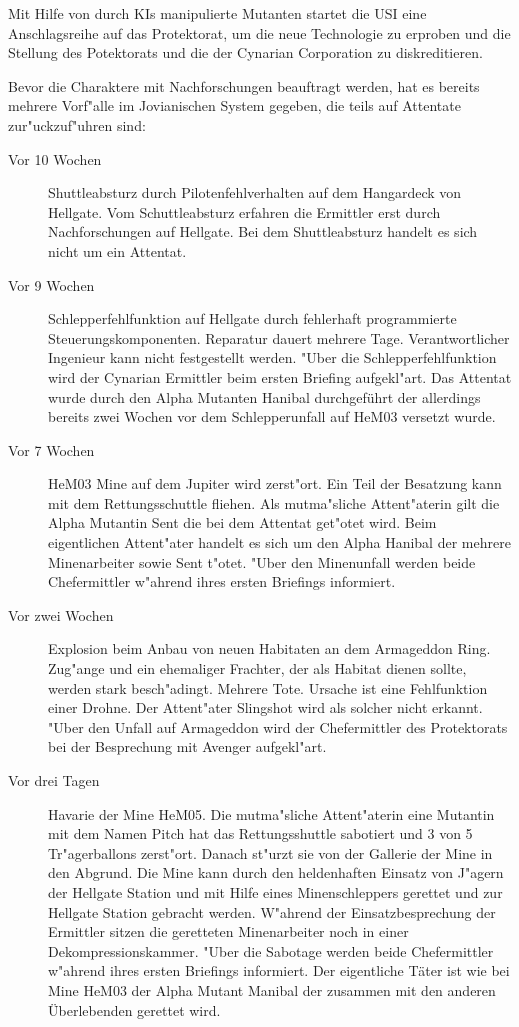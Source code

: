 
Mit Hilfe von durch KIs manipulierte Mutanten startet die USI eine Anschlagsreihe auf das Protektorat, um die neue Technologie zu erproben und die Stellung des Potektorats und die der Cynarian Corporation zu diskreditieren.

Bevor die Charaktere mit Nachforschungen beauftragt werden, hat es bereits mehrere Vorf"alle im Jovianischen System gegeben, die teils auf Attentate zur"uckzuf"uhren sind:

\begin{description}
\item [Vor 10 Wochen] Shuttleabsturz durch Pilotenfehlverhalten auf dem Hangardeck von Hellgate. Vom Schuttleabsturz erfahren die 
      Ermittler erst durch Nachforschungen auf Hellgate. Bei dem Shuttleabsturz handelt es sich nicht um ein Attentat.
\item [Vor 9 Wochen] Schlepperfehlfunktion auf Hellgate durch fehlerhaft programmierte Steuerungskomponenten. Reparatur dauert
      mehrere Tage. Verantwortlicher Ingenieur kann nicht festgestellt werden. "Uber die Schlepperfehlfunktion wird der Cynarian Ermittler beim ersten Briefing aufgekl"art. Das Attentat wurde durch den Alpha Mutanten Hanibal durchgeführt der allerdings bereits zwei Wochen vor dem Schlepperunfall auf HeM03 versetzt wurde.      
\item [Vor 7 Wochen] HeM03 Mine auf dem Jupiter wird zerst"ort. Ein Teil der Besatzung kann mit dem  Rettungsschuttle fliehen. Als 
      mutma"sliche Attent"aterin gilt die Alpha Mutantin Sent die bei dem Attentat get"otet wird. Beim eigentlichen Attent"ater handelt es sich um den Alpha Hanibal der mehrere Minenarbeiter sowie Sent t"otet. "Uber den Minenunfall werden beide Chefermittler w"ahrend ihres ersten Briefings informiert.
\item [Vor zwei Wochen] Explosion beim Anbau von neuen Habitaten an dem Armageddon Ring. Zug"ange und ein
      ehemaliger Frachter, der als Habitat dienen sollte, werden stark besch"adingt.  Mehrere Tote. Ursache ist eine Fehlfunktion einer Drohne. Der Attent"ater Slingshot wird als solcher nicht erkannt. "Uber den Unfall auf Armageddon wird der Chefermittler des Protektorats bei der Besprechung mit Avenger aufgekl"art.
\item [Vor drei Tagen] Havarie der Mine HeM05. Die mutma"sliche Attent"aterin eine Mutantin mit dem Namen Pitch hat das
      Rettungsshuttle sabotiert und 3 von 5 Tr"agerballons zerst"ort. Danach st"urzt sie von der Gallerie der Mine in den Abgrund. Die Mine kann durch den heldenhaften Einsatz von J"agern der Hellgate Station und mit Hilfe eines Minenschleppers gerettet und zur Hellgate Station gebracht werden. W"ahrend der Einsatzbesprechung der Ermittler sitzen die geretteten Minenarbeiter noch in einer Dekompressionskammer. "Uber die Sabotage werden beide Chefermittler w"ahrend ihres ersten Briefings informiert. Der eigentliche
      Täter ist wie bei Mine HeM03 der Alpha Mutant Manibal der zusammen mit den anderen Überlebenden gerettet wird.
\end{description}

